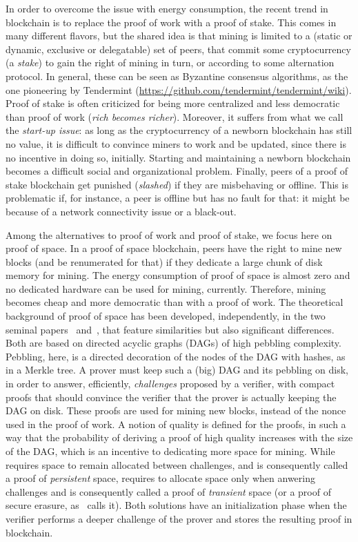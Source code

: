 In order to overcome the issue with energy consumption, the recent trend in blockchain is to
replace the proof of work with a proof of stake. This comes in many different flavors, but
the shared idea is that mining is limited to a (static or dynamic, exclusive or delegatable)
set of peers, that commit
some cryptocurrency (a \emph{stake}) to gain the right of mining
in turn, or according to some alternation protocol. In general, these can be seen
as Byzantine consensus algorithms, as the one pioneering by
Tendermint (\url{https://github.com/tendermint/tendermint/wiki}).
Proof of stake is often criticized for being more centralized and less democratic than proof of work
(\emph{rich becomes richer}).
Moreover, it suffers from what we call the \emph{start-up issue}: as long as the cryptocurrency
of a newborn blockchain has still no value, it is difficult to convince miners to work and
be updated, since there is no incentive in doing so, initially. Starting and maintaining
a newborn blockchain becomes a difficult social and organizational problem. Finally, peers of
a proof of stake blockchain get punished (\emph{slashed}) if they are misbehaving or offline.
This is problematic if, for instance, a peer is offline but has no fault for that: it might be
because of a network connectivity issue or a black-out.

Among the alternatives to proof of work and proof of stake, we focus here on proof of space.
In a proof of space blockchain, peers have the right to mine new blocks (and be renumerated for that) if they dedicate
a large chunk of disk memory for mining. The energy consumption of proof of space is almost zero
and no dedicated hardware can be used for mining, currently. Therefore, mining becomes cheap and
more democratic than with a proof of work.
The theoretical background of proof of space has been developed, independently,
in the two seminal papers~\cite{AtenieseBFG14} and~\cite{DziembowskiFKP15},
that feature similarities but also significant differences. Both are based
on directed acyclic graphs (DAGs) of high pebbling complexity.
Pebbling, here, is a directed decoration of the nodes of the DAG with hashes, as in
a Merkle tree.
A prover must keep such a (big) DAG and its pebbling on disk, in order to answer, efficiently,
\emph{challenges} proposed by a verifier, with compact proofs that should convince the verifier that
the prover is actually keeping the DAG on disk. These proofs are used for mining new blocks,
instead of the nonce used in the proof of work. A notion of quality is defined for
the proofs, in such a way that the probability of deriving a proof of high quality increases
with the size of the DAG, which is an incentive to dedicating more space for mining.
While~\cite{DziembowskiFKP15} requires space to remain allocated between challenges,
and is consequently called a proof of \emph{persistent} space, \cite{AtenieseBFG14} requires
to allocate space only when anwering challenges and is consequently called
a proof of \emph{transient} space (or a proof of secure erasure, as~\cite{DziembowskiFKP15} calls it).
Both solutions have an initialization phase when the verifier performs a deeper challenge
of the prover and stores the resulting proof in blockchain.

